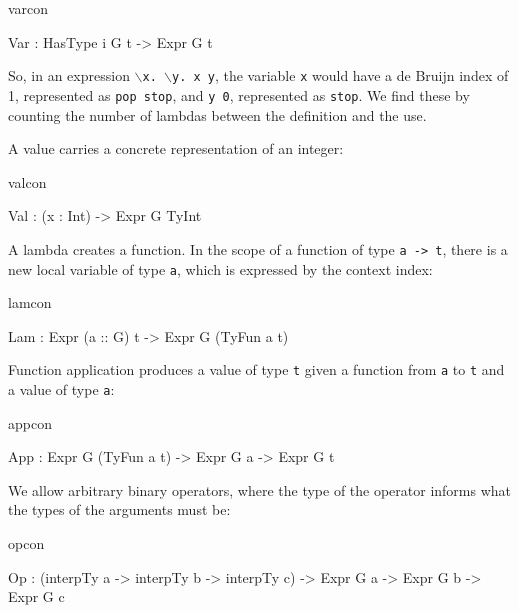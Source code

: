 \begin{SaveVerbatim}{varcon}

Var : HasType i G t -> Expr G t

\end{SaveVerbatim}

\noindent
So, in an expression \texttt{$\backslash$x. $\backslash$y. x y}, 
the variable \texttt{x} would have a de Bruijn index
of 1, represented as \texttt{pop stop}, and \texttt{y 0}, represented
as \texttt{stop}. We find these by counting the number of lambdas between the
definition and the use.

\noindent
A value carries a concrete representation of an integer: 

\begin{SaveVerbatim}{valcon}

Val : (x : Int) -> Expr G TyInt

\end{SaveVerbatim}

\noindent
A lambda creates a function. In the scope of a function of type \texttt{a -> t}, there is
a new local variable of type \texttt{a}, which is expressed by the context index:

\begin{SaveVerbatim}{lamcon}

Lam : Expr (a :: G) t -> Expr G (TyFun a t)

\end{SaveVerbatim}

\noindent
Function application produces a value of type \texttt{t} given a function from 
\texttt{a} to \texttt{t}
and a value of type \texttt{a}:

\begin{SaveVerbatim}{appcon}

App : Expr G (TyFun a t) -> Expr G a -> Expr G t

\end{SaveVerbatim}

\noindent
We allow arbitrary binary operators, where the type of the operator
informs what the types of the arguments must be:

\begin{SaveVerbatim}{opcon}

Op  : (interpTy a -> interpTy b -> interpTy c) -> Expr G a -> Expr G b -> 
      Expr G c

\end{SaveVerbatim}

